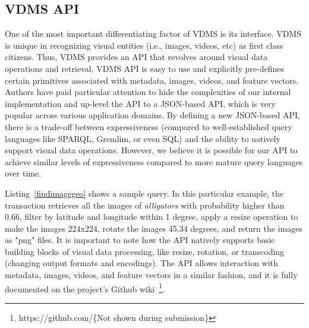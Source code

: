 \subsection{VDMS API}

One of the most important differentiating factor of VDMS is its interface.
VDMS is unique in recognizing visual entities (i.e., images, videos, etc)
as first class citizens. Thus, VDMS provides an API that revolves 
around visual data operations and retrieval. 
VDMS API is easy to use and explicitly pre-defines certain
primitives associated with metadata, images, videos, and feature vectors.
Authors have paid particular attention to hide the complexities of our internal
implementation and up-level the API to a JSON-based API,
which is very popular across various application domains.
By defining a new JSON-based API, there is a trade-off between expressiveness 
(compared to well-established query languages like SPARQL, Gremlim, or even SQL) 
and the ability to natively support visual data operations.
However, we believe it is possible for our API to achieve similar levels of
expressiveness compared to more mature query languages over time.

Listing~\ref{findimagegeo} shows a sample query. 
In this particular example, the transaction retrieves 
all the images of \textit{alligators} 
with probability higher than 0.66,
filter by latitude and longitude within 1 degree, 
apply a resize operation to make the images 224x224, 
rotate the images 45.34 degrees, 
and return the images as "png" files. 
It is important to note how the API natively supports basic building 
blocks of visual data processing, like resize, rotation, or transcoding
(changing output formats and encodings).
The API allows interaction with metadata, images, videos, 
and feature vectors in a similar fashion, and it is fully 
documented on the project's Github 
wiki~\footnote{https://github.com/\{Not shown during submission\}}.

